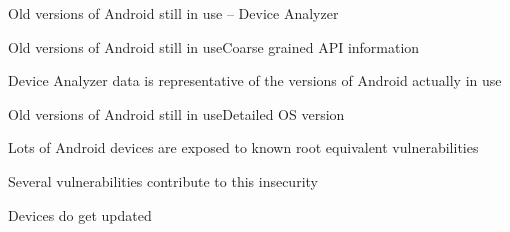 \documentclass{beamer}
\begin{document}
\begin{frame}{Old versions of Android still in use -- Device Analyzer}{}
 \begin{center}
 \end{center}
\end{frame}

\begin{frame}{Old versions of Android still in use}{Coarse grained API information}
 \begin{center}
 \end{center}
Device Analyzer data is representative of the versions of Android actually in use
\end{frame}

\begin{frame}{Old versions of Android still in use}{Detailed OS version}
 \begin{center}
  \vspace{-0.5em}
 \end{center}
\end{frame}

\begin{frame}{Lots of Android devices are exposed to known root equivalent vulnerabilities}{}
 \begin{center}
  \vspace{-0.5em}
 \end{center}
\end{frame}

\begin{frame}{Several vulnerabilities contribute to this insecurity}{}
 \begin{center}
  \vspace{-0.5em}
 \end{center}
\end{frame}

\begin{frame}{Devices do get updated}{}
 \begin{center}
  \vspace{-0.5em}
 \end{center}
\end{frame}
\end{document}
